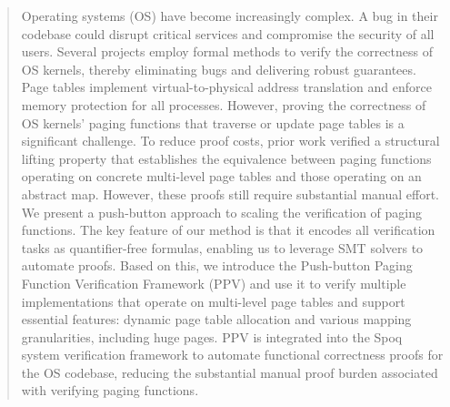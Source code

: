 \begin{abstract}
Operating systems (OS) have become increasingly complex. A bug in their codebase could disrupt critical services and compromise the security of all users. Several projects employ formal methods to verify the correctness of OS kernels, thereby eliminating bugs and delivering robust guarantees. 
Page tables implement virtual-to-physical address translation and enforce memory protection for all processes.
However, proving the correctness of OS kernels' paging functions that traverse or update page tables is a significant challenge. To reduce proof costs, prior work verified a structural lifting property that establishes the equivalence between paging functions operating on concrete multi-level page tables and those operating on an abstract map. However, these proofs still require substantial manual effort. We present a push-button approach to scaling the verification of paging functions. The key feature of our method is that it encodes all verification tasks as quantifier-free formulas, enabling us to leverage SMT solvers to automate proofs. Based on this, we introduce the Push-button Paging Function Verification Framework (PPV) and use it to verify multiple implementations that operate on multi-level page tables and support essential features: dynamic page table allocation and various mapping granularities, including huge pages. PPV is integrated into the Spoq system verification framework to automate functional correctness proofs for the OS codebase, reducing the substantial manual proof burden associated with verifying paging functions.
\end{abstract}